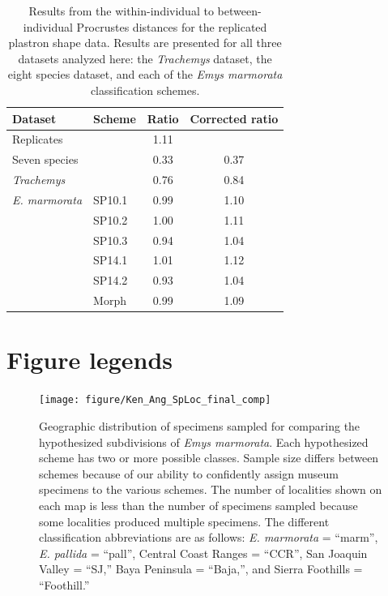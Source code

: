 \documentclass[11pt]{article}
\begin{document}
\begin{table}[h]
  \caption{Results from the within-individual to between-individual Procrustes distances for the replicated plastron shape data. Results are presented for all three datasets analyzed here: the \textit{Trachemys} dataset, the eight species dataset, and each of the \textit{Emys marmorata} classification schemes.}
  \label{tab:rep_res}
  \centering
  \begin{tabular}{l l c c}
    \textbf{Dataset} & \textbf{Scheme} & \textbf{Ratio} & \textbf{Corrected ratio} \\
    \hline
    Replicates & & 1.11 & \\
    \hline
    Seven species & & 0.33 & 0.37 \\
    \textit{Trachemys} & & 0.76 & 0.84 \\
    \hline
    \textit{E. marmorata} & SP10.1 & 0.99 & 1.10 \\
     & SP10.2 & 1.00 & 1.11 \\
     & SP10.3 & 0.94 & 1.04 \\
     & SP14.1 & 1.01 & 1.12 \\
     & SP14.2 & 0.93 & 1.04 \\
     & Morph & 0.99 & 1.09 \\
    \hline
  \end{tabular}
\end{table}


\newpage{}


\section*{Figure legends}

\begin{figure}[h!]
  \centering
  \texttt{[image: figure/Ken\_Ang\_SpLoc\_final\_comp]}
  \caption{Geographic distribution of specimens sampled for comparing the hypothesized subdivisions of \textit{Emys marmorata}. Each hypothesized scheme has two or more possible classes. Sample size differs between schemes because of our ability to confidently assign museum specimens to the various schemes. The number of localities shown on each map is less than the number of specimens sampled because some localities produced multiple specimens. The different classification abbreviations are as follows: \textit{E. marmorata} = ``marm'', \textit{E. pallida} = ``pall'', Central Coast Ranges = ``CCR'', San Joaquin Valley = ``SJ,'' Baya Peninsula = ``Baja,'', and Sierra Foothills = ``Foothill.''}
  \label{fig:map}
\end{figure}
\end{document}
